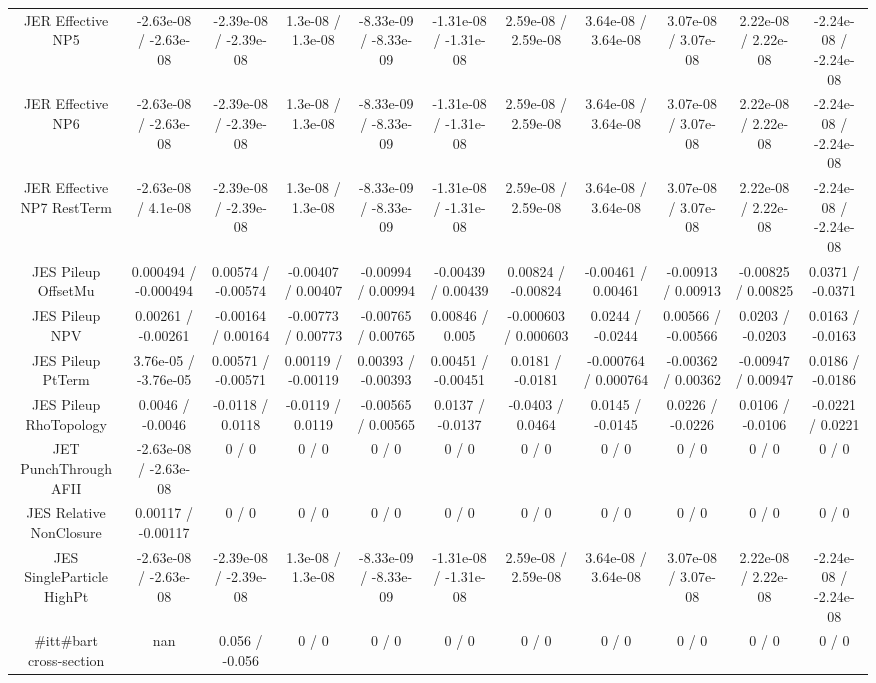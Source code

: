 \begin{table}[htbp]
\begin{center}
\begin{tabular}{|c|c|c|c|c|c|c|c|c|c|c|}
  JER Effective NP5 & -2.63e-08 / -2.63e-08 & -2.39e-08 / -2.39e-08 & 1.3e-08 / 1.3e-08 & -8.33e-09 / -8.33e-09 & -1.31e-08 / -1.31e-08 & 2.59e-08 / 2.59e-08 & 3.64e-08 / 3.64e-08 & 3.07e-08 / 3.07e-08 & 2.22e-08 / 2.22e-08 & -2.24e-08 / -2.24e-08 \\ 
  JER Effective NP6 & -2.63e-08 / -2.63e-08 & -2.39e-08 / -2.39e-08 & 1.3e-08 / 1.3e-08 & -8.33e-09 / -8.33e-09 & -1.31e-08 / -1.31e-08 & 2.59e-08 / 2.59e-08 & 3.64e-08 / 3.64e-08 & 3.07e-08 / 3.07e-08 & 2.22e-08 / 2.22e-08 & -2.24e-08 / -2.24e-08 \\ 
  JER Effective NP7 RestTerm & -2.63e-08 / 4.1e-08 & -2.39e-08 / -2.39e-08 & 1.3e-08 / 1.3e-08 & -8.33e-09 / -8.33e-09 & -1.31e-08 / -1.31e-08 & 2.59e-08 / 2.59e-08 & 3.64e-08 / 3.64e-08 & 3.07e-08 / 3.07e-08 & 2.22e-08 / 2.22e-08 & -2.24e-08 / -2.24e-08 \\ 
  JES Pileup OffsetMu & 0.000494 / -0.000494 & 0.00574 / -0.00574 & -0.00407 / 0.00407 & -0.00994 / 0.00994 & -0.00439 / 0.00439 & 0.00824 / -0.00824 & -0.00461 / 0.00461 & -0.00913 / 0.00913 & -0.00825 / 0.00825 & 0.0371 / -0.0371 \\ 
  JES Pileup NPV & 0.00261 / -0.00261 & -0.00164 / 0.00164 & -0.00773 / 0.00773 & -0.00765 / 0.00765 & 0.00846 / 0.005 & -0.000603 / 0.000603 & 0.0244 / -0.0244 & 0.00566 / -0.00566 & 0.0203 / -0.0203 & 0.0163 / -0.0163 \\ 
  JES Pileup PtTerm & 3.76e-05 / -3.76e-05 & 0.00571 / -0.00571 & 0.00119 / -0.00119 & 0.00393 / -0.00393 & 0.00451 / -0.00451 & 0.0181 / -0.0181 & -0.000764 / 0.000764 & -0.00362 / 0.00362 & -0.00947 / 0.00947 & 0.0186 / -0.0186 \\ 
  JES Pileup RhoTopology & 0.0046 / -0.0046 & -0.0118 / 0.0118 & -0.0119 / 0.0119 & -0.00565 / 0.00565 & 0.0137 / -0.0137 & -0.0403 / 0.0464 & 0.0145 / -0.0145 & 0.0226 / -0.0226 & 0.0106 / -0.0106 & -0.0221 / 0.0221 \\ 
  JET PunchThrough AFII & -2.63e-08 / -2.63e-08 & 0 / 0 & 0 / 0 & 0 / 0 & 0 / 0 & 0 / 0 & 0 / 0 & 0 / 0 & 0 / 0 & 0 / 0 \\ 
  JES Relative NonClosure & 0.00117 / -0.00117 & 0 / 0 & 0 / 0 & 0 / 0 & 0 / 0 & 0 / 0 & 0 / 0 & 0 / 0 & 0 / 0 & 0 / 0 \\ 
  JES SingleParticle HighPt & -2.63e-08 / -2.63e-08 & -2.39e-08 / -2.39e-08 & 1.3e-08 / 1.3e-08 & -8.33e-09 / -8.33e-09 & -1.31e-08 / -1.31e-08 & 2.59e-08 / 2.59e-08 & 3.64e-08 / 3.64e-08 & 3.07e-08 / 3.07e-08 & 2.22e-08 / 2.22e-08 & -2.24e-08 / -2.24e-08 \\ 
  #it{t#bar{t}} cross-section &    nan    & 0.056 / -0.056 & 0 / 0 & 0 / 0 & 0 / 0 & 0 / 0 & 0 / 0 & 0 / 0 & 0 / 0 & 0 / 0 \\ 

\end{tabular}
\end{center}
\end{table}
